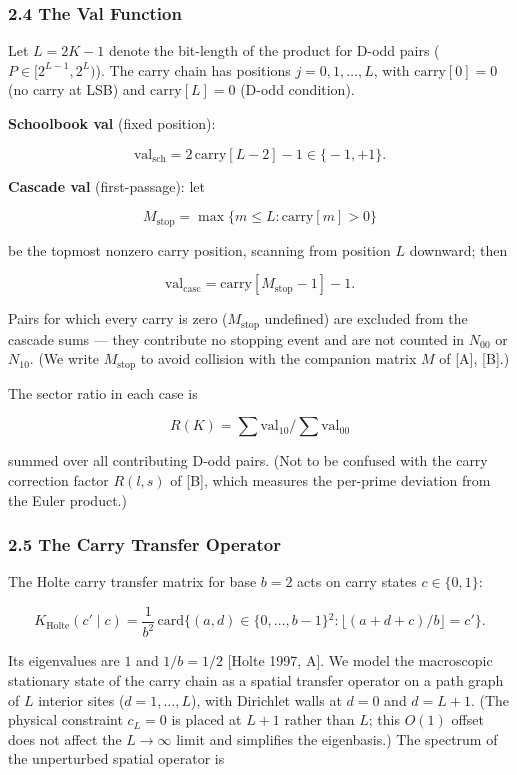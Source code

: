 \documentclass[
  11pt,
]{article}
\begin{document}
\subsubsection{2.4 The Val Function}\label{the-val-function}

Let \(L = 2K - 1\) denote the bit-length of the product for D-odd pairs
(\(P \in [2^{L-1}, 2^L)\)). The carry chain has positions
\(j = 0, 1, \ldots, L\), with \(\mathrm{carry}[0] = 0\) (no carry at LSB) and
\(\mathrm{carry}[L] = 0\) (D-odd condition).

\textbf{Schoolbook val} (fixed position):

\[\mathrm{val}_{\mathrm{sch}} = 2\,\mathrm{carry}[L-2] - 1 \in \lbrace{}-1, +1\rbrace{}.\]

\textbf{Cascade val} (first-passage): let

\[M_{\mathrm{stop}} = \max\lbrace{}m \leq L : \mathrm{carry}[m] > 0\rbrace{}\]

be the topmost nonzero carry position, scanning from position \(L\) downward;
then

\[\mathrm{val}_{\mathrm{casc}} = \mathrm{carry}[M_{\mathrm{stop}}-1] - 1.\]

Pairs for which every carry is zero (\(M_{\mathrm{stop}}\) undefined) are
excluded from the cascade sums --- they contribute no stopping event and are not
counted in \(N_{00}\) or \(N_{10}\). (We write \(M_{\mathrm{stop}}\) to avoid
collision with the companion matrix \(M\) of {[}A{]}, {[}B{]}.)

The sector ratio in each case is

\[R(K) = \sum \mathrm{val}_{10} / \sum \mathrm{val}_{00}\]

summed over all contributing D-odd pairs. (Not to be confused with the carry
correction factor \(R(l,s)\) of {[}B{]}, which measures the per-prime deviation
from the Euler product.)

\subsubsection{2.5 The Carry Transfer
Operator}\label{the-carry-transfer-operator}

The Holte carry transfer matrix for base \(b = 2\) acts on carry states
\(c \in \lbrace{}0, 1\rbrace{}\):

\[K_{\mathrm{Holte}}(c' \mid c) = \frac{1}{b^2}\,\mathrm{card}\lbrace{}(a,d) \in \lbrace{}0,\ldots,b-1\rbrace{}^2 : \lfloor(a + d + c)/b\rfloor = c'\rbrace{}.\]

Its eigenvalues are \(1\) and \(1/b = 1/2\) {[}Holte 1997, A{]}. We model the
macroscopic stationary state of the carry chain as a spatial transfer operator
on a path graph of \(L\) interior sites (\(d = 1, \ldots, L\)), with Dirichlet
walls at \(d = 0\) and \(d = L + 1\). (The physical constraint \(c_L = 0\) is
placed at \(L + 1\) rather than \(L\); this \(O(1)\) offset does not affect the
\(L \to \infty\) limit and simplifies the eigenbasis.) The spectrum of the
unperturbed spatial operator is
\end{document}
